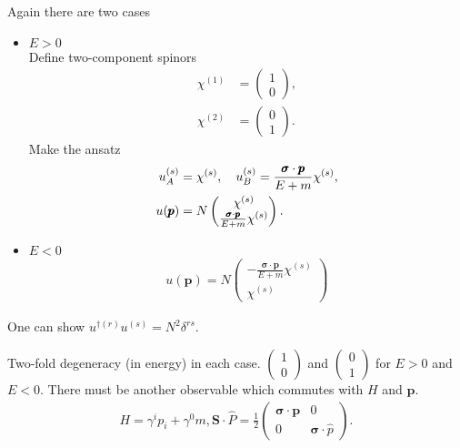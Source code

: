 Again there are two cases
\begin{itemize}
   \item $E>0$ \\
      Define two-component spinors
      \begin{align*}
         \chi^{(1)} &= \begin{pmatrix} 1 \\ 0\end{pmatrix}, \\
         \chi^{(2)} &= \begin{pmatrix} 0 \\ 1\end{pmatrix}.
      \end{align*}
Make the ansatz 
\begin{align}
   u_A^{(s)} &= \chi^{(s)}, \quad u_B^{(s)} = \frac{\pmb{\sigma}\cdot\pmb{p}}{E + m} \chi^{(s)}, \notag\\
   u(\pmb{p}) &= N \begin{pmatrix} \chi^{(s)} \\ \frac{\pmb{\sigma}\cdot\pmb{p}}{E + m} \chi^{(s)}\end{pmatrix}.
\end{align}
\item
$E < 0$
\begin{align}
   u(\pmb{p}) = N \begin{pmatrix} -\frac{\pmb{\sigma}\cdot\pmb{p}}{E + m} \chi^{(s)} \\ \chi^{(s)}\end{pmatrix}
\end{align}
\end{itemize}
One can show $u^{\dagger (r)} u^{(s)} = N^2 \delta^{rs}$.

Two-fold degeneracy (in energy) in each case. $ \begin{pmatrix} 1 \\ 0\end{pmatrix}$ and $ \begin{pmatrix} 0 \\ 1\end{pmatrix} $ for $E > 0$ and $E < 0$. There must be another observable which commutes with $H$ and $\pmb{p}$.
\begin{align}
   H = \gamma^i p_i + \gamma^0 m,
   \pmb{S} \cdot \hat{P} = \frac{1}{2} \begin{pmatrix} \pmb{\sigma}\cdot\pmb{p} & 0 \\ 0 & \pmb{\sigma}\cdot \hat{p}\end{pmatrix}.
\end{align}

